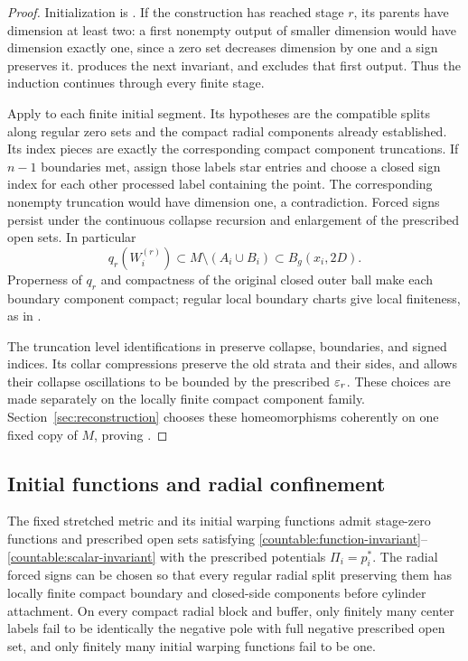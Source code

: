 \begin{proof}
Initialization is . If the construction has
reached stage $r$, its parents have dimension at least two: a first
nonempty output of smaller dimension would have dimension exactly
one, since a zero set decreases dimension by one and a sign preserves it.
 produces the next invariant, and
 excludes that first output. Thus the
induction continues through every finite stage.

Apply  to each finite initial segment.
Its hypotheses are the compatible splits along regular zero sets and the compact
radial components already established. Its index pieces are exactly
the corresponding compact component truncations. If $n-1$ boundaries met,
assign those labels star entries and choose a closed sign index for
each other processed label containing the point. The corresponding
nonempty truncation would have dimension one, a contradiction.
Forced signs persist under the continuous collapse recursion and
enlargement of the prescribed open sets. In particular
\[
 q_r(W_i^{(r)})\subset M\setminus(A_i\cup B_i)
                         \subset B_g(x_i,2D).
\]
Properness of $q_r$ and compactness of the original closed outer ball
make each boundary component compact; regular local boundary charts give
local finiteness, as in .

The truncation level identifications in  preserve
collapse, boundaries, and signed indices. Its collar compressions preserve
the old strata and their sides, and 
allows their collapse oscillations to be bounded by the prescribed
$\varepsilon_r$. These choices are made separately on the locally finite
compact component family. Section~\ref{sec:reconstruction} chooses these homeomorphisms
coherently on one fixed copy of $M$, proving .
\end{proof}

\subsection{Initial functions and radial confinement}

\begin{lemma}\label{countable:initial}
The fixed stretched metric and its initial warping functions admit stage-zero
functions and prescribed open sets satisfying
\eqref{countable:function-invariant}--\eqref{countable:scalar-invariant}
with the prescribed potentials $\Pi_i=p_i^*$. The radial forced signs can be
chosen so that every regular radial split preserving them has locally
finite compact boundary and closed-side components before cylinder
attachment. On every compact radial block and buffer, only finitely
many center labels fail to be identically the negative pole with full
negative prescribed open set, and only finitely many initial warping functions fail to be one.
\end{lemma}

